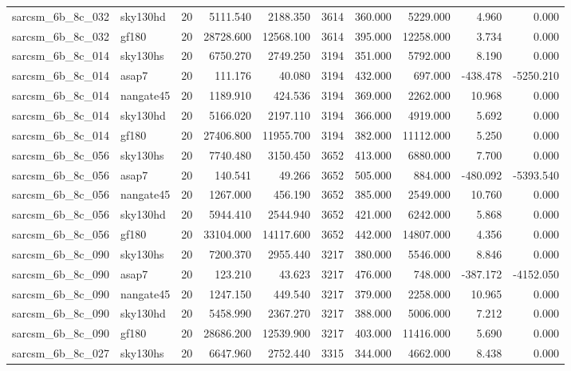 \begin{longtable}{llrrrrrrrr}
sarcsm\_6b\_8c\_032 & sky130hd & 20 & 5111.540 & 2188.350 & 3614 & 360.000 & 5229.000 & 4.960 & 0.000 \\
sarcsm\_6b\_8c\_032 & gf180 & 20 & 28728.600 & 12568.100 & 3614 & 395.000 & 12258.000 & 3.734 & 0.000 \\
sarcsm\_6b\_8c\_014 & sky130hs & 20 & 6750.270 & 2749.250 & 3194 & 351.000 & 5792.000 & 8.190 & 0.000 \\
sarcsm\_6b\_8c\_014 & asap7 & 20 & 111.176 & 40.080 & 3194 & 432.000 & 697.000 & -438.478 & -5250.210 \\
sarcsm\_6b\_8c\_014 & nangate45 & 20 & 1189.910 & 424.536 & 3194 & 369.000 & 2262.000 & 10.968 & 0.000 \\
sarcsm\_6b\_8c\_014 & sky130hd & 20 & 5166.020 & 2197.110 & 3194 & 366.000 & 4919.000 & 5.692 & 0.000 \\
sarcsm\_6b\_8c\_014 & gf180 & 20 & 27406.800 & 11955.700 & 3194 & 382.000 & 11112.000 & 5.250 & 0.000 \\
sarcsm\_6b\_8c\_056 & sky130hs & 20 & 7740.480 & 3150.450 & 3652 & 413.000 & 6880.000 & 7.700 & 0.000 \\
sarcsm\_6b\_8c\_056 & asap7 & 20 & 140.541 & 49.266 & 3652 & 505.000 & 884.000 & -480.092 & -5393.540 \\
sarcsm\_6b\_8c\_056 & nangate45 & 20 & 1267.000 & 456.190 & 3652 & 385.000 & 2549.000 & 10.760 & 0.000 \\
sarcsm\_6b\_8c\_056 & sky130hd & 20 & 5944.410 & 2544.940 & 3652 & 421.000 & 6242.000 & 5.868 & 0.000 \\
sarcsm\_6b\_8c\_056 & gf180 & 20 & 33104.000 & 14117.600 & 3652 & 442.000 & 14807.000 & 4.356 & 0.000 \\
sarcsm\_6b\_8c\_090 & sky130hs & 20 & 7200.370 & 2955.440 & 3217 & 380.000 & 5546.000 & 8.846 & 0.000 \\
sarcsm\_6b\_8c\_090 & asap7 & 20 & 123.210 & 43.623 & 3217 & 476.000 & 748.000 & -387.172 & -4152.050 \\
sarcsm\_6b\_8c\_090 & nangate45 & 20 & 1247.150 & 449.540 & 3217 & 379.000 & 2258.000 & 10.965 & 0.000 \\
sarcsm\_6b\_8c\_090 & sky130hd & 20 & 5458.990 & 2367.270 & 3217 & 388.000 & 5006.000 & 7.212 & 0.000 \\
sarcsm\_6b\_8c\_090 & gf180 & 20 & 28686.200 & 12539.900 & 3217 & 403.000 & 11416.000 & 5.690 & 0.000 \\
sarcsm\_6b\_8c\_027 & sky130hs & 20 & 6647.960 & 2752.440 & 3315 & 344.000 & 4662.000 & 8.438 & 0.000 \\

\end{longtable}
